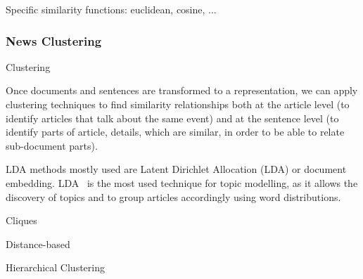 






Specific similarity functions: euclidean, cosine, ...





\subsubsection{News Clustering}
Clustering

Once documents and sentences are transformed to a representation, we can apply clustering techniques to find similarity relationships both at the article level (to identify articles that talk about the same event) and at the sentence level (to identify parts of article, details, which are similar, in order to be able to relate sub-document parts).

LDA
methods mostly used are Latent Dirichlet Allocation (LDA) or document embedding.
LDA~\cite{blei2003latent} is the most used technique for topic modelling, as it allows the discovery of topics and to group articles accordingly using word distributions.

Cliques

Distance-based

Hierarchical Clustering


